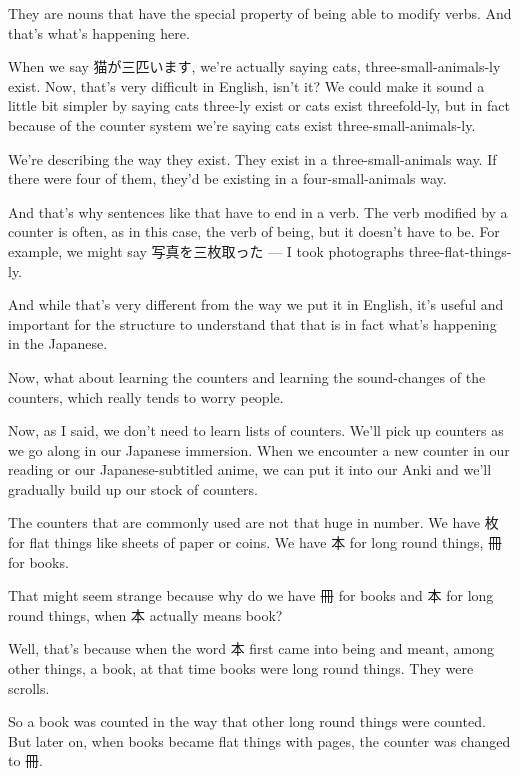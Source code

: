 They are nouns that have the special property of being able to modify verbs. And that's what's happening here.

When we say 猫が三匹います, we're actually saying cats, three-small-animals-ly exist. Now, that's very difficult in English, isn't it? We could make it sound a little bit simpler by saying cats three-ly exist or cats exist threefold-ly, but in fact because of the counter system we're saying cats exist three-small-animals-ly.

We're describing the way they exist. They exist in a three-small-animals way. If there were four of them, they'd be existing in a four-small-animals way.

And that's why sentences like that have to end in a verb. The verb modified by a counter is often, as in this case, the verb of being, but it doesn't have to be. For example, we might say 写真を三枚取った --- I took photographs three-flat-things-ly.

{}

And while that's very different from the way we put it in English, it's useful and important for the structure to understand that that is in fact what's happening in the Japanese.

Now, what about learning the counters and learning the sound-changes of the counters, which really tends to worry people.

\thinrule

Now, as I said, we don't need to learn lists of counters. We'll pick up counters as we go along in our Japanese immersion. When we encounter a new counter in our reading or our Japanese-subtitled anime, we can put it into our Anki and we'll gradually build up our stock of counters.

The counters that are commonly used are not that huge in number. We have 枚 for flat things like sheets of paper or coins. We have 本 for long round things, 冊 for books.

That might seem strange because why do we have 冊 for books and 本 for long round things, when 本 actually means book?

\thinrule

Well, that's because when the word 本 first came into being and meant, among other things, a book, at that time books were long round things. They were scrolls.

{}

So a book was counted in the way that other long round things were counted. But later on, when books became flat things with pages, the counter was changed to 冊.

